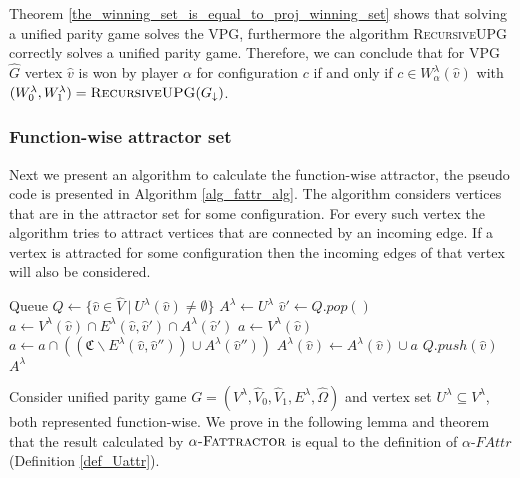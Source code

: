 Theorem \ref{the_winning_set_is_equal_to_proj_winning_set} shows that solving a unified parity game solves the VPG, furthermore the algorithm \textsc{RecursiveUPG} correctly solves a unified parity game. Therefore, we can conclude that for VPG $\hat{G}$ vertex $\hat{v}$ is won by player $\alpha$ for configuration $c$ if and only if $c \in W_\alpha^\lambda(\hat{v})$ with $(W^\lambda_0,W^\lambda_1) = \textsc{RecursiveUPG}(G_{\downarrow})$.

\subsubsection{Function-wise attractor set}
Next we present an algorithm to calculate the function-wise attractor, the pseudo code is presented in Algorithm \ref{alg_fattr_alg}. The algorithm considers vertices that are in the attractor set for some configuration. For every such vertex the algorithm tries to attract vertices that are connected by an incoming edge. If a vertex is attracted for some configuration then the incoming edges of that vertex will also be considered.
\begin{algorithm}
	\caption{$\textsc{$\alpha$-FAttractor}(G, U^\lambda : \hat{V} \rightarrow 2^\mathfrak{C})$}\label{alg_fattr_alg}
	\begin{algorithmic}[1]
		\State Queue $Q \gets \{\hat{v} \in \hat{V} \ |\ U^\lambda(\hat{v}) \neq \emptyset  \}$
		\State $A^\lambda \gets U^\lambda$
		\State $\hat{v}' \gets Q.pop()$
				\State $a \gets V^\lambda(\hat{v}) \cap E^\lambda(\hat{v},\hat{v}') \cap A^\lambda(\hat{v}')$
			\Else
				\State $a \gets V^\lambda(\hat{v})$
					\State $a \gets a \cap ((\mathfrak{C}\backslash E^\lambda(\hat{v},\hat{v}'')) \cup A^\lambda(\hat{v}''))$
				\EndFor
			\EndIf
				\State $A^\lambda(\hat{v}) \gets A^\lambda(\hat{v}) \cup a$
				\State $Q.push(\hat{v})$
			\EndIf
		\EndFor
		\EndWhile
		\State \Return $A^\lambda$
	\end{algorithmic}
\end{algorithm}

Consider unified parity game $G = (V^\lambda,\hat{V}_0,\hat{V}_1,E^\lambda,\hat{\Omega})$ and vertex set $U^\lambda \subseteq V^\lambda$, both represented function-wise. We prove in the following lemma and theorem that the result calculated by $\alpha\textsc{-Fattractor}$ is equal to the definition of $\alpha\textit{-FAttr}$ (Definition \ref{def_Uattr}). 

